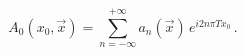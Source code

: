 \begin{equation}
  \label{eq:a0abel}
A_0(x_0,\vec x) = 
\sum\limits_{n=-\infty}^{+\infty} a_n(\vec x) \, e^{i 2 n \pi T x_0} \,.
\end{equation}

